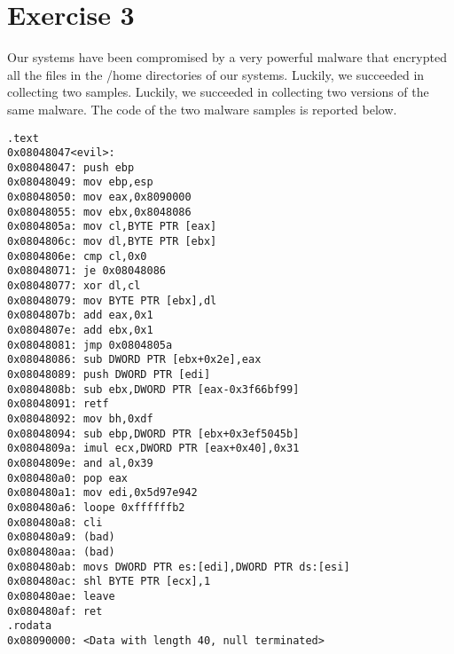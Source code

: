 \section{Exercise 3}

Our systems have been compromised by a very powerful malware that encrypted all the files in the /home directories of our systems.
Luckily, we succeeded in collecting two samples. 
Luckily, we succeeded in collecting two versions of the same malware. 
The code of the two malware samples is reported below.
\begin{verbatim}
.text
0x08048047<evil>:
0x08048047: push ebp
0x08048049: mov ebp,esp
0x08048050: mov eax,0x8090000
0x08048055: mov ebx,0x8048086
0x0804805a: mov cl,BYTE PTR [eax]
0x0804806c: mov dl,BYTE PTR [ebx]
0x0804806e: cmp cl,0x0
0x08048071: je 0x08048086
0x08048077: xor dl,cl
0x08048079: mov BYTE PTR [ebx],dl
0x0804807b: add eax,0x1
0x0804807e: add ebx,0x1
0x08048081: jmp 0x0804805a
0x08048086: sub DWORD PTR [ebx+0x2e],eax
0x08048089: push DWORD PTR [edi]
0x0804808b: sub ebx,DWORD PTR [eax-0x3f66bf99]
0x08048091: retf
0x08048092: mov bh,0xdf
0x08048094: sub ebp,DWORD PTR [ebx+0x3ef5045b]
0x0804809a: imul ecx,DWORD PTR [eax+0x40],0x31
0x0804809e: and al,0x39
0x080480a0: pop eax
0x080480a1: mov edi,0x5d97e942
0x080480a6: loope 0xffffffb2
0x080480a8: cli
0x080480a9: (bad)
0x080480aa: (bad)
0x080480ab: movs DWORD PTR es:[edi],DWORD PTR ds:[esi]
0x080480ac: shl BYTE PTR [ecx],1
0x080480ae: leave
0x080480af: ret
.rodata
0x08090000: <Data with length 40, null terminated>
\end{verbatim}

